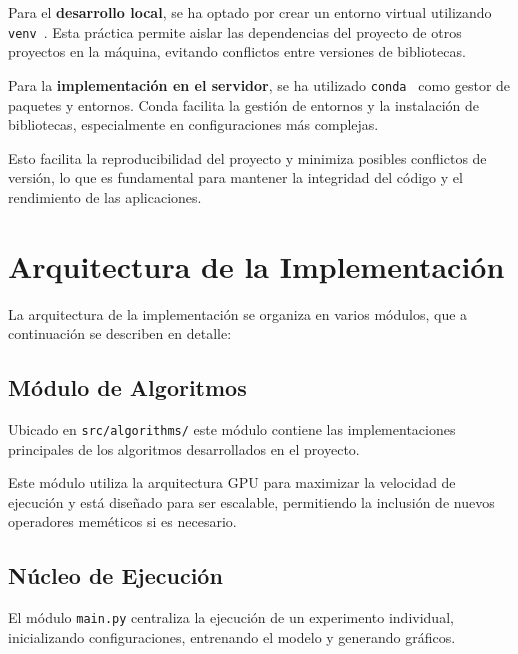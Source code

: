 Para el \textbf{desarrollo local}, se ha optado por crear un entorno virtual utilizando
\texttt{venv}~\cite{CreationVirtualEnvironments}.
Esta práctica permite aislar las dependencias del proyecto de otros proyectos en la máquina, evitando conflictos entre
versiones de bibliotecas.


Para la \textbf{implementación en el servidor}, se ha utilizado \texttt{conda}~\cite{CondaDocumentation} como gestor
de paquetes y entornos.
Conda facilita la gestión de entornos y la instalación de bibliotecas, especialmente en configuraciones más complejas.



Esto facilita la reproducibilidad del proyecto y minimiza posibles conflictos de versión, lo que es fundamental para
mantener la integridad del código y el rendimiento de las aplicaciones.

\section{Arquitectura de la Implementación}\label{sec:arquitectura-de-la-implementacion}
La arquitectura de la implementación se organiza en varios módulos, que a continuación se describen en detalle:

\subsection{Módulo de Algoritmos}\label{subsec:modulo-de-algoritmos}
Ubicado en \texttt{src/algorithms/} este módulo contiene las implementaciones principales de los
algoritmos desarrollados en el proyecto.

Este módulo utiliza la arquitectura GPU para maximizar la velocidad de ejecución y está diseñado para ser escalable,
permitiendo la inclusión de nuevos operadores meméticos si es necesario.

\subsection{Núcleo de Ejecución}\label{subsec:nucleo-de-ejecucion}
El módulo \texttt{main.py} centraliza la ejecución de un experimento individual, inicializando configuraciones,
entrenando el modelo y generando gráficos.


